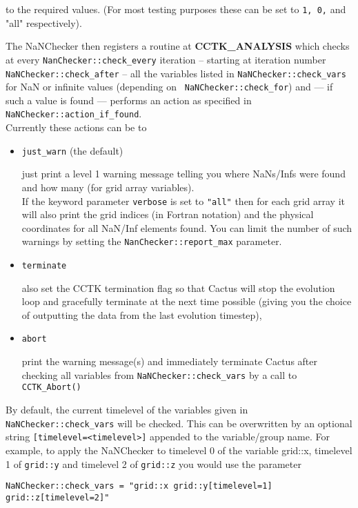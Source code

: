 \documentclass{article}
\begin{document}
\noindent
to the required
values. (For most testing purposes these can be set to {\tt 1, 0,} and {"all"} 
respectively).

The NaNChecker then registers a routine at {\bf CCTK\_ANALYSIS} which checks
at every {\tt NanChecker::check\_every} iteration -- starting at iteration
number {\tt NaNChecker::check\_after} -- all the variables listed in
{\tt NaNChecker::check\_vars} for NaN or infinite values (depending on {\tt
NaNChecker::check\_for}) and --- if such a value is found --- performs an
action as specified in {\tt NaNChecker::action\_if\_found}.\\

Currently these actions can be to
\begin{itemize}
 \item{\tt just\_warn} (the default) 

   just print a level 1 warning message telling you where NaNs/Infs were found
   and how many (for grid array variables).\\
   If the keyword parameter {\tt verbose} is set to {\tt "all"} then for each
   grid array it will also print the grid indices (in Fortran notation)
   and the physical coordinates for all NaN/Inf elements found.
   You can limit the number of
   such warnings by setting the {\tt NanChecker::report\_max} parameter.

 \item{\tt terminate} 

also set the CCTK termination flag so that Cactus will stop the evolution
   loop and gracefully terminate at the next time possible (giving you the
   choice of outputting the data from the last evolution timestep),

 \item{\tt abort} 

print the warning message(s) and immediately terminate Cactus after checking
all variables from {\tt NaNChecker::check\_vars} by a call to {\tt CCTK\_Abort()}
\end{itemize}

By default, the current timelevel of the variables given in
{\tt NaNChecker::check\_vars} will be checked. This can be overwritten by
an optional string {\tt [timelevel=<timelevel>]} appended to the
variable/group name. For example, to apply the NaNChecker to timelevel 0
of the variable grid::x, timelevel 1 of {\tt grid::y} and timelevel 2 of 
{\tt grid::z} you would use the parameter

\noindent
{\tt NaNChecker::check\_vars = "grid::x grid::y[timelevel=1] grid::z[timelevel=2]"}
\end{document}
